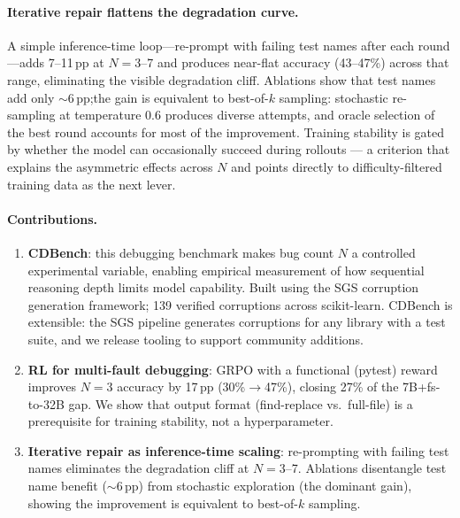 \documentclass[12pt]{article}
\begin{document}
\paragraph{Iterative repair flattens the degradation curve.}
A simple inference-time loop---re-prompt with failing test names after each
round---adds 7--11\,pp at $N{=}3$--7 and produces near-flat accuracy (43--47\%)
across that range, eliminating the visible degradation cliff. Ablations show
that test names add only ${\sim}6$\,pp;the gain is equivalent to best-of-$k$ sampling: stochastic re-sampling at temperature 0.6 produces diverse attempts, and oracle selection of the best round accounts for most of the improvement. Training stability is gated by whether the model can occasionally succeed during rollouts — a criterion that explains the asymmetric effects across $N$ and points directly to difficulty-filtered training data as the next lever.


\paragraph{Contributions.}
\begin{enumerate}[topsep=2pt,itemsep=1pt]
  \item \textbf{CDBench}: this debugging benchmark makes bug count $N$ a
  controlled experimental variable, enabling empirical measurement of how
  sequential reasoning depth limits model capability. Built using the SGS
  corruption generation framework; 139 verified corruptions across scikit-learn. 
  CDBench is extensible: the SGS pipeline generates corruptions for any library
  with a test suite, and we release tooling to support community additions.

  \item \textbf{RL for multi-fault debugging}: GRPO with a functional (pytest)
  reward improves $N{=}3$ accuracy by 17\,pp (30\%$\to$47\%), closing 27\% of
  the 7B+fs-to-32B gap. We show that output format (find-replace vs.\ full-file)
  is a prerequisite for training stability, not a hyperparameter.

  \item \textbf{Iterative repair as inference-time scaling}: re-prompting with
  failing test names eliminates the degradation cliff at $N{=}3$--7. Ablations
  disentangle test name benefit (${\sim}6$\,pp) from stochastic exploration
  (the dominant gain), showing the improvement is equivalent to best-of-$k$
  sampling.
\end{enumerate}
\end{document}
